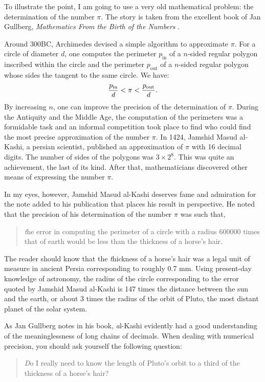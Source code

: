 To illustrate the point, I am going to use a very old mathematical
problem: the determination of the number $\pi$. The story is taken
from the excellent book of Jan Gullberg, {\em Mathematics From the
Birth of the Numbers} \cite{Gullberg}.

Around 300BC, Archimedes devised a simple algorithm to approximate $\pi$. For a circle of diameter $d$, one computes the perimeter
$p_{\mathop{\textrm{in}}}$ of a $n$-sided regular polygon inscribed within the circle and the perimeter $p_{\mathop{\textrm{out}}}$ of a
$n$-sided regular polygon whose sides the tangent to the same circle.
We have:
\begin{equation}
{\displaystyle p_{\mathop{\textrm{in}}} \over\displaystyle d
}<\pi<{\displaystyle p_{\mathop{\textrm{out}}} \over\displaystyle d}.
\end{equation}
By increasing $n$, one can improve the precision of the
determination of $\pi$. During the Antiquity and the Middle Age,
the computation of the perimeters was a formidable task and an
informal competition took place to find who could find the most
precise approximation of the number $\pi$. In 1424, Jamshid Masud
al-Kashi, a persian scientist, published an approximation of $\pi$
with 16 decimal digits. The number of sides of the polygons was
$3\times 2^8$. This was quite an achievement, the last of its
kind. After that, mathematicians discovered other means of
expressing the number $\pi$.

In my eyes, however, Jamshid Masud al-Kashi deserves fame and
admiration for the note added to his publication that places his
result in perspective. He noted that the precision of his
determination of the number $\pi$ was such that,
\begin{quote}{\textit the error
in computing the perimeter of a circle with a radius 600000 times
that of earth would be less than the thickness of a horse's hair}.
\end{quote}
The reader should know that the {\textit thickness of a horse's
hair\/} was a legal unit of measure in ancient Persia
corresponding to roughly 0.7 mm. Using present-day knowledge of
astronomy, the radius of the circle corresponding to the error
quoted by Jamshid Masud al-Kashi is 147 times the distance between
the sun and the earth, or about 3 times the radius of the orbit of
Pluto, the most distant planet of the solar system.

As Jan Gullberg notes in his book, {\textit al-Kashi evidently had a
good understanding of the meaninglessness of long chains of
decimals}. When dealing with numerical precision, you should ask
yourself the following question:
\begin{quote}
{\textsl Do I really need to know the length of Pluto's orbit to a
third of the thickness of a horse's hair?}
\end{quote}

